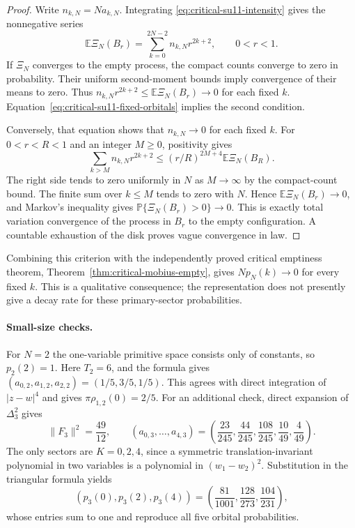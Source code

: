 \documentclass[11pt,a4paper]{article}
\numberwithin{equation}{section}
\theoremstyle{definition}
\theoremstyle{remark}
\begin{document}
\begin{proof}
Write $n_{k,N}=Na_{k,N}$. Integrating
\eqref{eq:critical-su11-intensity} gives the nonnegative series
\[
 \mathbb E\Xi_N(B_r)=\sum_{k=0}^{2N-2}n_{k,N}r^{2k+2},
 \qquad 0<r<1.
\]
If $\Xi_N$ converges to the empty process, the compact counts converge
to zero in probability. Their uniform second-moment bounds imply
convergence of their means to zero. Thus
$n_{k,N}r^{2k+2}\leq\mathbb E\Xi_N(B_r)\to0$ for each fixed $k$.
Equation~\eqref{eq:critical-su11-fixed-orbitals} implies the second
condition.

Conversely, that equation shows that $n_{k,N}\to0$ for each fixed $k$.
For $0<r<R<1$ and an integer $M\geq0$, positivity gives
\[
 \sum_{k>M}n_{k,N}r^{2k+2}
 \leq(r/R)^{2M+4}\mathbb E\Xi_N(B_R).
\]
The right side tends to zero uniformly in $N$ as $M\to\infty$ by the
compact-count bound. The finite sum over $k\leq M$ tends to zero with
$N$. Hence $\mathbb E\Xi_N(B_r)\to0$, and Markov's inequality gives
$\mathbb P\{\Xi_N(B_r)>0\}\to0$. This is exactly total variation
convergence of the process in $B_r$ to the empty configuration.
A countable exhaustion of the disk proves vague convergence in law.
\end{proof}

Combining this criterion with the independently proved critical
emptiness theorem, Theorem~\ref{thm:critical-mobius-empty}, gives
$Np_N(k)\to0$ for every fixed $k$. This is a qualitative consequence;
the representation does not presently give a decay rate for these
primary-sector probabilities.

\paragraph{Small-size checks.}
For $N=2$ the one-variable primitive space consists only of constants,
so $p_2(2)=1$. Here $T_2=6$, and the formula gives
$(a_{0,2},a_{1,2},a_{2,2})=(1/5,3/5,1/5)$.
This agrees with direct integration of $|z-w|^4$ and gives
$\pi\rho_{1,2}(0)=2/5$.
For an additional check, direct expansion of $\Delta_3^2$ gives
\[
 \|F_3\|^2=\frac{49}{12},\qquad
 (a_{0,3},\ldots,a_{4,3})
 =\left(\frac{23}{245},\frac{44}{245},\frac{108}{245},
                   \frac{10}{49},\frac4{49}\right).
\]
The only sectors are $K=0,2,4$, since a symmetric translation-invariant
polynomial in two variables is a polynomial in $(w_1-w_2)^2$.
Substitution in the triangular formula yields
\[
 (p_3(0),p_3(2),p_3(4))
 =\left(\frac{81}{1001},\frac{128}{273},\frac{104}{231}\right),
\]
whose entries sum to one and reproduce all five orbital probabilities.
\end{document}
